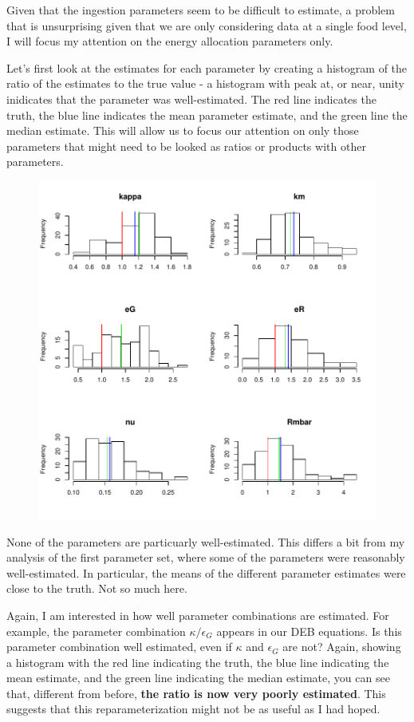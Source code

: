 \documentclass[12pt,reqno,final]{amsart}
\theoremstyle{plain}
\numberwithin{equation}{part}
\begin{document}
Given that the ingestion parameters seem to be difficult to estimate,
a problem that is unsurprising given that we are only considering data
at a single food level, I will focus my attention on the energy
allocation parameters only.

Let's first look at the estimates for each parameter by creating a
histogram of the ratio of the estimates to the true value - a
histogram with peak at, or near, unity inidicates that the parameter
was well-estimated. The red line indicates the truth, the blue line
indicates the mean parameter estimate, and the green line the median
estimate. This will allow us to focus our attention on only those
parameters that might need to be looked as ratios or products with
other parameters.
\begin{figure}
\includegraphics{Solving_the_problem_of_parameter_covariation_2-003}
\end{figure}

None of the parameters are particuarly well-estimated. This differs a
bit from my analysis of the first parameter set, where some of the
parameters were reasonably well-estimated. In particular, the means of
the different parameter estimates were close to the truth. Not so much
here.

Again, I am interested in how well parameter combinations are
estimated. For example, the parameter combination $\kappa/\epsilon_G$
appears in our DEB equations. Is this parameter combination well
estimated, even if $\kappa$ and $\epsilon_G$ are not? Again, showing a
histogram with the red line indicating the truth, the blue line
indicating the mean estimate, and the green line indicating the median
estimate, you can see that, different from before, \textbf{the ratio is now
very poorly estimated}. This suggests that this reparameterization
might not be as useful as I had hoped.
\end{document}
